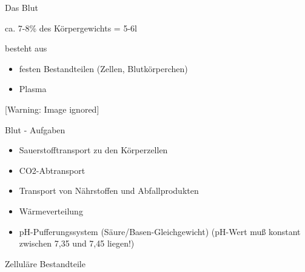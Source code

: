 \documentclass{article}
\begin{document}
Das Blut

ca. 7-8\% des K\"orpergewichts = 5-6l

besteht aus

\begin{itemize}
\item festen Bestandteilen (Zellen, Blutk\"orperchen)

\item {}Plasma

\end{itemize}
  [Warning: Image ignored] %
 

Blut - Aufgaben

\begin{itemize}
\item Sauerstofftransport zu den K\"orperzellen

\item CO2-Abtransport

\item Transport von N\"ahrstoffen und Abfallprodukten

\item W\"armeverteilung

\item pH-Pufferungssystem (S\"aure/Basen-Gleichgewicht) (pH-Wert mu{\ss}
konstant zwischen 7,35 und 7,45 liegen!)

\end{itemize}
Zellul\"are Bestandteile
\end{document}
